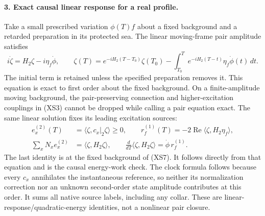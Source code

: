 \documentclass[11pt]{article}
\begin{document}
\paragraph{3. Exact causal linear response for a real profile.}
Take a small prescribed variation $\phi(T)f$ about a fixed
background and a retarded preparation in its protected sea.
The linear moving-frame pair amplitude satisfies
\begin{equation}
 i\dot\zeta=H_2\zeta-i\eta_f\dot\phi,\qquad
 \zeta(T)=e^{-iH_2(T-T_0)}\zeta(T_0)
       -\int_{T_0}^T e^{-iH_2(T-t)}
                              \eta_f\dot\phi(t)\,dt .
 \tag{XS7}
\end{equation}
The initial term is retained unless the specified preparation
removes it.  This equation is exact to first order about
the fixed background.  On a finite-amplitude moving background,
the pair-preserving connection and higher-excitation couplings
in (XS3) cannot be dropped while calling a pair equation exact.
The same linear solution fixes its leading excitation sources:
\begin{equation}
 \begin{aligned}
 e_x^{(2)}(T)&=\langle\zeta,c_x|_2\zeta\rangle\geq0,\qquad
 r_f^{(1)}(T)=-2\operatorname{Re}
                         \langle\zeta,H_2\eta_f\rangle,\\
 \sum_xN_xe_x^{(2)}&=\langle\zeta,H_2\zeta\rangle,\qquad
 \frac{d}{dT}\langle\zeta,H_2\zeta\rangle
                              =\dot\phi\,r_f^{(1)} .
 \end{aligned}\tag{XS7a}
\end{equation}
The last identity is at the fixed background of (XS7).
It follows directly from that equation and is the causal
energy-work check.  The clock formula follows because every
$c_x$ annihilates the instantaneous reference, so neither
its normalization correction nor an unknown second-order
state amplitude contributes at this order.  It sums all
native source labels, including any collar.
These are linear-response/quadratic-energy identities,
not a nonlinear pair closure.
\end{document}
